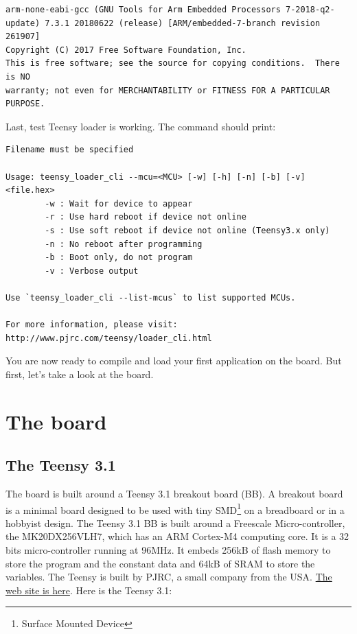 \documentclass[11pt]{report}
\newcommand{\unixcl}[1]{\texttt{\fcolorbox{black}{gray!20}{\footnotesize#1}}}
\begin{document}
\medskip

\begin{shaded*}
\tiny
\vspace{-1.7mm}
\begin{verbatim}
arm-none-eabi-gcc (GNU Tools for Arm Embedded Processors 7-2018-q2-update) 7.3.1 20180622 (release) [ARM/embedded-7-branch revision 261907]
Copyright (C) 2017 Free Software Foundation, Inc.
This is free software; see the source for copying conditions.  There is NO
warranty; not even for MERCHANTABILITY or FITNESS FOR A PARTICULAR PURPOSE.

\end{verbatim}
\end{shaded*}

Last, test Teensy loader is working. The command \unixcl{teensy-loader-cli} should print:

\medskip

\begin{shaded*}
\tiny
\vspace{-1.7mm}
\begin{verbatim}
Filename must be specified

Usage: teensy_loader_cli --mcu=<MCU> [-w] [-h] [-n] [-b] [-v] <file.hex>
        -w : Wait for device to appear
        -r : Use hard reboot if device not online
        -s : Use soft reboot if device not online (Teensy3.x only)
        -n : No reboot after programming
        -b : Boot only, do not program
        -v : Verbose output

Use `teensy_loader_cli --list-mcus` to list supported MCUs.

For more information, please visit:
http://www.pjrc.com/teensy/loader_cli.html
\end{verbatim}
\end{shaded*}

You are now ready to compile and load your first application on the board. But first, let's take a look at the board.

\chapter{The board}

\section{The Teensy 3.1}
\label{teensy}

The board is built around a Teensy 3.1 breakout board (BB). A breakout board is a minimal board designed to be used with tiny SMD\footnote{Surface Mounted Device} on a breadboard or in a hobbyist design. The Teensy 3.1 BB is built around a Freescale Micro-controller, the MK20DX256VLH7, which has an ARM Cortex-M4 computing core. It is a 32 bits micro-controller running at 96MHz. It embeds 256kB of flash memory to store the program and the constant data and 64kB of SRAM to store the variables. The Teensy is built by PJRC, a small company from the USA. \href{https://www.pjrc.com/teensy/teensy31.html}{The web site is here}. Here is the Teensy 3.1:
\end{document}
